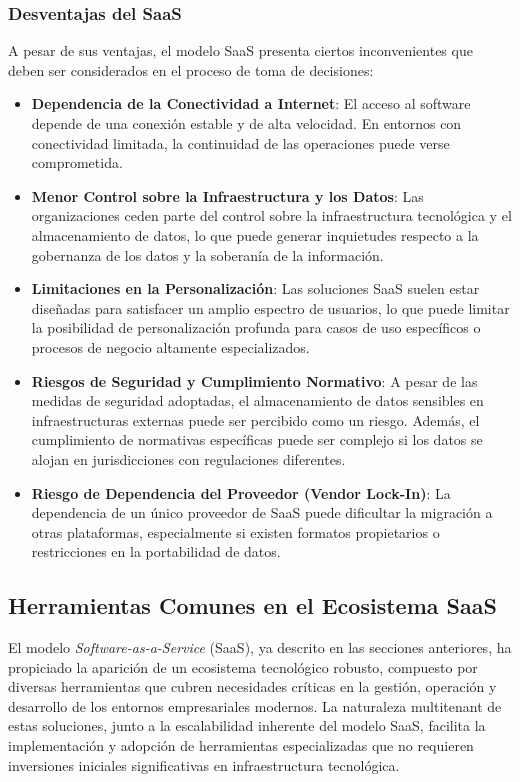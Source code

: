 {            \subsubsection{Desventajas del SaaS}
                A pesar de sus ventajas, el modelo SaaS presenta ciertos inconvenientes que deben ser considerados en el proceso de toma de decisiones:
                \begin{itemize}
                    \item \textbf{Dependencia de la Conectividad a Internet}: El acceso al software depende de una conexión estable y de alta velocidad. En entornos con conectividad limitada, la continuidad de las operaciones puede verse comprometida.
                    \item \textbf{Menor Control sobre la Infraestructura y los Datos}: Las organizaciones ceden parte del control sobre la infraestructura tecnológica y el almacenamiento de datos, lo que puede generar inquietudes respecto a la gobernanza de los datos y la soberanía de la información.
                    \item \textbf{Limitaciones en la Personalización}: Las soluciones SaaS suelen estar diseñadas para satisfacer un amplio espectro de usuarios, lo que puede limitar la posibilidad de personalización profunda para casos de uso específicos o procesos de negocio altamente especializados.
                    \item \textbf{Riesgos de Seguridad y Cumplimiento Normativo}: A pesar de las medidas de seguridad adoptadas, el almacenamiento de datos sensibles en infraestructuras externas puede ser percibido como un riesgo. Además, el cumplimiento de normativas específicas puede ser complejo si los datos se alojan en jurisdicciones con regulaciones diferentes.
                    \item \textbf{Riesgo de Dependencia del Proveedor (Vendor Lock-In)}: La dependencia de un único proveedor de SaaS puede dificultar la migración a otras plataformas, especialmente si existen formatos propietarios o restricciones en la portabilidad de datos.
                \end{itemize}
        
        \subsection{Herramientas Comunes en el Ecosistema SaaS}
            El modelo \textit{Software-as-a-Service} (SaaS), ya descrito en las secciones anteriores, ha propiciado la aparición de un ecosistema tecnológico robusto, compuesto por diversas herramientas que cubren necesidades críticas en la gestión, operación y desarrollo de los entornos empresariales modernos. La naturaleza multitenant de estas soluciones, junto a la escalabilidad inherente del modelo SaaS, facilita la implementación y adopción de herramientas especializadas que no requieren inversiones iniciales significativas en infraestructura tecnológica.
            
}
